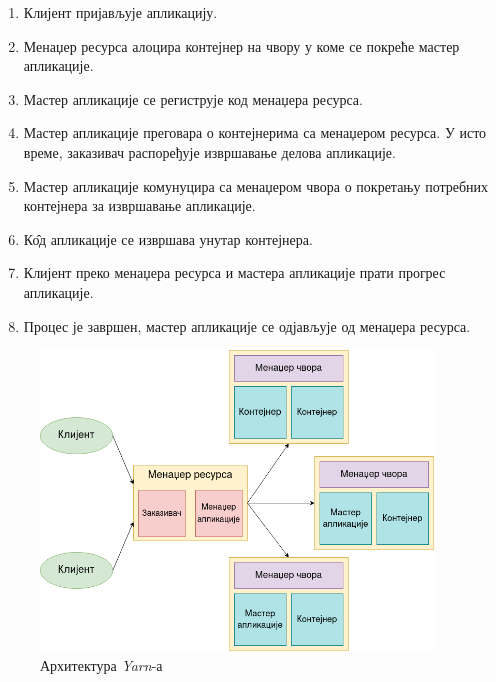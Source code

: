 \documentclass[12pt,oneside]{memoir}
\begin{document}
\begin{enumerate}
	\item Клијент пријављује апликацију.
	\item Менаџер ресурса алоцира контејнер на чвору у коме се покреће мастер апликације.
	\item Мастер апликације се региструје код менаџера ресурса.
	\item Мастер апликације преговара о контејнерима са менаџером ресурса. У исто време, заказивач распоређује извршавање делова апликације.
	\item Мастер апликације комунуцира са менаџером чвора о покретању потребних контејнера за извршавање апликације.
	\item К\^{о}д апликације се извршава унутар контејнера.
	\item Клијент преко менаџера ресурса и мастера апликације прати прогрес апликације.
	\item Процес је завршен, мастер апликације се одјављује од менаџера ресурса.
\end{enumerate}

\begin{figure}[!ht]
  \centering
  \includegraphics[width=0.93\textwidth]{pictures/yarn_arch.png}
  \caption{Архитектура \textit{Yarn}-а}
  \label{fig:yarn_ar}
\end{figure}
\end{document}
